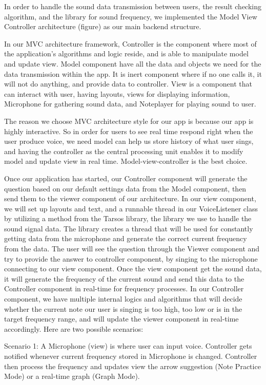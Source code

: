 \documentclass{article}
\begin{document}
In order to handle the sound data transmission between users, the result checking algorithm, and the library for sound frequency, we implemented the Model View Controller architecture (figure) as our main backend structure.

In our MVC architecture framework, Controller is the component where most of the application’s algorithms and logic reside, and is able to manipulate model and update view. Model component have all the data and objects we need for the data transmission within the app. It is inert component where if no one calls it, it will not do anything, and provide data to controller.  View is a component that can interact with user, having layouts, views for displaying information, Microphone for gathering sound data, and Noteplayer for playing sound to user. 

The reason we choose MVC architecture style for our app is because our app is highly interactive. So  in order for users to see real time respond right when the user produce voice, we need  model can help us store history of what user sings, and having the controller as the central processing unit enables it to modify model and update view in real time. Model-view-controller is the best choice.

Once our application has started, our Controller component will generate the question based on our default settings data from the Model component, then send them to the viewer component of our architecture. In our view component, we will set up layouts and text, and a runnable thread in our VoiceListener class by utilizing a method from the Tarsos library, the library we use to handle the sound signal data. The library creates a thread that will be used for constantly getting data from the microphone and generate the correct current frequency from the data. The user will see the question through the Viewer component and try to provide the answer to controller component, by singing to the microphone connecting to our view component. Once the view component get the sound data, it will generate the frequency of the current sound and send this data to the Controller component in real-time for frequency processes. In our Controller component, we have multiple internal logics and algorithms that will decide whether the current note our user is singing is too high, too low or is in the target frequency range, and will update the viewer component in real-time accordingly. Here are two possible scenarios:


Scenario 1:
A Microphone (view) is where user can input voice. Controller gets notified whenever current frequency stored in Microphone is changed. Controller then process the frequency and updates view the arrow suggestion (Note Practice Mode) or a real-time graph (Graph Mode). 
\end{document}
